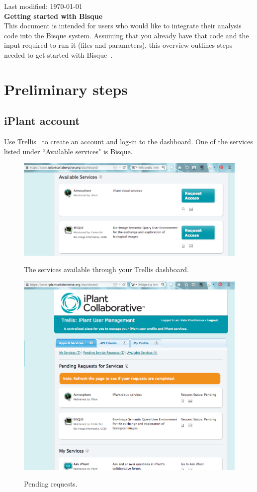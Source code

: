\documentclass[12pt]{article}
\begin{document}

\hfill Last modified: \today \\%

\noindent
{\Large \bf Getting started with Bisque}\\ 

This document is intended for users who would like to integrate their analysis code into the Bisque system.
Assuming that you already have that code and the input  required to run it (files and parameters), this overview
outlines steps needed to get started with Bisque~\cite{Bisque}.

\section{Preliminary steps}
\label{sec:Preliminary}
\subsection{iPlant account}
\label{sec:iPlant_account}

Use Trellis~\cite{Trellis}
to create an account and log-in to the dashboard.
One of the services listed under ``Available services" is Bisque.

\begin{figure}[h]
\centering
  \includegraphics[width=0.6\linewidth]{./figures/available_services.png}
  \label{fig:available_services}
  \caption{The services available through your Trellis dashboard.}
\end{figure}

\begin{figure}[h]
\centering
  \includegraphics[width=0.6\linewidth]{./figures/pending_request.png}
  \label{fig:pending_request}
  \caption{Pending requests.}
\end{figure}
\end{document}
